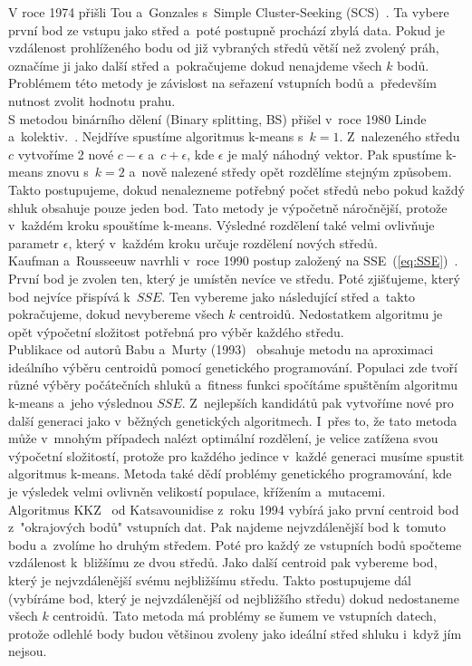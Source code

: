 V roce 1974 přišli Tou a~Gonzales s~Simple Cluster-Seeking (SCS)~\cite{Tou74}. Ta vybere první bod ze vstupu jako střed a~poté postupně prochází zbylá data. Pokud je vzdálenost prohlíženého bodu od již vybraných středů větší než zvolený práh, označíme ji jako další střed a~pokračujeme dokud nenajdeme všech $k$ bodů. Problémem této metody je závislost na seřazení vstupních bodů a~především nutnost zvolit hodnotu prahu.\\

S metodou binárního dělení (Binary splitting, BS) přišel v~roce 1980 Linde a~kolektiv.~\cite{Linde80}. Nejdříve spustíme algoritmus k-means s~$k=1$. Z~nalezeného středu $c$ vytvoříme 2 nové $c-\epsilon$ a~$c+\epsilon$, kde $\epsilon$ je malý náhodný vektor. Pak spustíme k-means znovu s~$k=2$ a~nově nalezené středy opět rozdělíme stejným způsobem. Takto postupujeme, dokud nenalezneme potřebný počet středů nebo pokud každý shluk obsahuje pouze jeden bod. Tato metody je výpočetně náročnější, protože v~každém kroku spouštíme k-means. Výsledné rozdělení také velmi ovlivňuje parametr $\epsilon$, který v~každém kroku určuje rozdělení nových středů.\\

Kaufman a~Rousseeuw navrhli v~roce 1990 postup založený na SSE~(\autoref{eq:SSE})~\cite{kaufman90}. První bod je zvolen ten, který je umístěn nevíce ve středu. Poté zjišťujeme, který bod nejvíce přispívá k~$SSE$. Ten vybereme jako následující střed a~takto pokračujeme, dokud nevybereme všech $k$ centroidů. Nedostatkem algoritmu je opět výpočetní složitost potřebná pro výběr každého středu.\\

Publikace od autorů Babu a~Murty (1993)~\cite{babu93} obsahuje metodu na aproximaci ideálního výběru centroidů pomocí genetického programování. Populaci zde tvoří různé výběry počátečních shluků a~fitness funkci spočítáme spuštěním algoritmu k-means a~jeho výslednou $SSE$. Z~nejlepších kandidátů pak vytvoříme nové pro další generaci jako v~běžných genetických algoritmech. I~přes to, že tato metoda může v~mnohým případech nalézt optimální rozdělení, je velice zatížena svou výpočetní složitostí, protože pro každého jedince v~každé generaci musíme spustit algoritmus k-means. Metoda také dědí problémy genetického programování, kde je výsledek velmi ovlivněn velikostí populace, křížením a~mutacemi.\\

Algoritmus KKZ~\cite{katsavounidis94} od Katsavounidise z~roku 1994 vybírá jako první centroid bod z~"okrajových bodů" vstupních dat. Pak najdeme nejvzdálenější bod k~tomuto bodu a~zvolíme ho druhým středem. Poté pro každý ze vstupních bodů spočteme vzdálenost k~bližšímu ze dvou středů. Jako další centroid pak vybereme bod, který je nejvzdálenější svému nejbližšímu středu. Takto postupujeme dál (vybíráme bod, který je nejvzdálenější od nejbližšího středu) dokud nedostaneme všech $k$ centroidů. Tato metoda má problémy se šumem ve vstupních datech, protože odlehlé body budou většinou zvoleny jako ideální střed shluku i~když jím nejsou.\\

